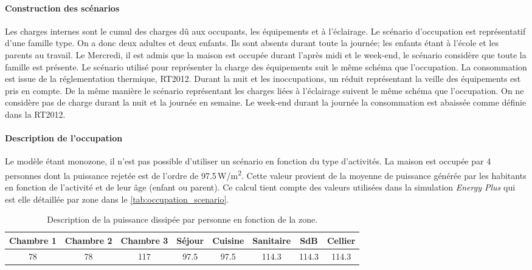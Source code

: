 \paragraph{Construction des scénarios} %
\label{par:construction_des_scenarios}
Les charges internes sont le cumul des charges dû aux occupants, les équipements et à l’éclairage.
Le scénario d’occupation est représentatif d’une famille type.
On a donc deux adultes et deux enfants. Ils sont absents durant toute la journée;
les enfants étant à l’école et les parents au travail. Le Mercredi, il est admis que
la maison est occupée durant l’après midi et le week-end, le scénario
considère que toute la famille est présente.
Le scénario utilisé pour représenter la charge des équipements suit le même schéma que
l’occupation. La consommation est issue de la réglementation thermique, RT2012. Durant la nuit et les
inoccupations, un réduit représentant la veille des équipements est pris en compte.
De la même manière le scénario représentant les charges liées à l’éclairage suivent
le même schéma que l’occupation. On ne considère pas de charge durant la nuit et la
journée en semaine. Le week-end durant la journée la consommation est abaissée comme
définie dans la RT2012.

\paragraph{Description de l’occupation} %
\label{par:description_de_l_occupation}
Le modèle étant monozone, il n’est pas possible d’utiliser un scénario
en fonction du type d’activités. La maison est occupée
par 4 personnes dont la puissance rejetée est de l’ordre de 97.5\,\si{W/m^{2}}.
Cette valeur provient de la moyenne de puissance générée par
les habitants en fonction de l’activité et de leur âge (enfant ou parent).
Ce calcul tient compte des valeurs utilisées dans la simulation \emph{Energy Plus} qui est
elle détaillée par zone dans le \autoref{tab:occupation_scenario}.

\begin{table}
\begin{tabular}{*8{c}}
    \toprule
    Chambre 1 & Chambre 2  & Chambre 3 & Séjour & Cuisine & Sanitaire & SdB   & Cellier \\
    \midrule
    78        & 78         & 117       & 97.5   & 97.5    & 114.3     & 114.3 & 114.3   \\
    \bottomrule
\end{tabular}
\caption{Description de la puissance dissipée par personne en fonction de la zone.}
\label{tab:puissance_occupants}
\end{table}

